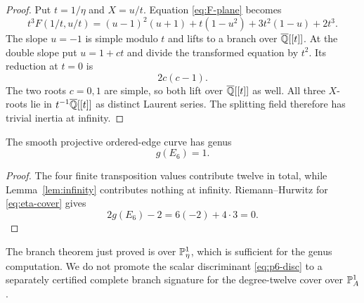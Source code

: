 \begin{proof}
Put $t=1/\eta$ and $X=u/t$.  Equation \eqref{eq:F-plane} becomes
\begin{equation}\label{eq:infinity-chart}
 t^3F(1/t,u/t)
 =(u-1)^2(u+1)+t(1-u^2)+3t^2(1-u)+2t^3.
\end{equation}
The slope $u=-1$ is simple modulo $t$ and lifts to a branch over
$\overline{\mathbb Q}[[t]]$.  At the double slope put $u=1+ct$ and divide the transformed
equation by $t^2$.  Its reduction at $t=0$ is
\[
 2c(c-1).
\]
The two roots $c=0,1$ are simple, so both lift over $\overline{\mathbb Q}[[t]]$ as well.
All three $X$-roots lie in $t^{-1}\overline{\mathbb Q}[[t]]$ as distinct Laurent series.
The splitting field therefore has trivial inertia at infinity.
\end{proof}

\begin{theorem}\label{thm:genus}
The smooth projective ordered-edge curve has genus
\begin{equation}\label{eq:genus-one}
 \boxed{g(E_6)=1.}
\end{equation}
\end{theorem}

\begin{proof}
The four finite transposition values contribute twelve in total, while
Lemma~\ref{lem:infinity} contributes nothing at infinity.
Riemann--Hurwitz for \eqref{eq:eta-cover} gives
\[
 2g(E_6)-2=6(-2)+4\cdot3=0.
\]
\end{proof}

\begin{remark}
The branch theorem just proved is over $\mathbb P^1_\eta$, which is sufficient for
the genus computation.  We do not promote the scalar discriminant
\eqref{eq:p6-disc} to a separately certified complete branch signature for
the degree-twelve cover over $\mathbb P^1_A$.
\end{remark}

